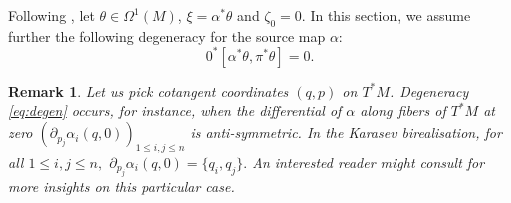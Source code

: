 \documentclass[a4paper,11pt]{article}
\newcommand{\blank}{{-}}
\newcommand{\AL}[1]{{ \framebox{AL:}~#1~\framebox{:AL}}}
\newcommand{\func}[1]{\mathcal{C}^{\infty}(#1)}
\newtheorem{theorem}{Theorem}[section]
\newtheorem{lemma}[theorem]{Lemma}
\newtheorem{remark}[theorem]{Remark}
\begin{document}
Following \cite{Cosserat23tac}, let $\theta \in \Omega^1(M)$, $\xi=\alpha^* \theta$ and $\zeta_0=0$. In this section, we assume further the following degeneracy for the source map $\alpha$:
\begin{equation}
\label{eq:degen}
 0^*[\alpha^* \theta,\pi^* \theta]=0.
\end{equation}
%
%
%
%
%
\begin{remark}
Let us pick cotangent coordinates $(q,p)$ on $T^*M$. Degeneracy \eqref{eq:degen} occurs, for instance, when the differential of $\alpha$ along fibers of $T^*M$ at zero $(\partial_{p_j} \alpha_i (q, 0))_{1 \leq i,j \leq n}$ is anti-symmetric. In the Karasev birealisation, for all $1 \leq i,j \leq n,$ $\partial_{p_j} \alpha_i (q, 0) = \{ q_i, q_j \}.$ An interested reader might consult \cite[eq. (3.6)]{dherin2016} for more insights on this particular case.
\end{remark}
\end{document}
